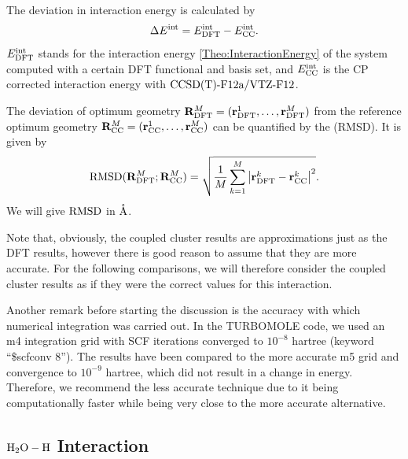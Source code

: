 The deviation in interaction energy is calculated by 
\newcommand\ecc{\enmat{\eint_{\te {CC}}}}
\begin{equation}
\Dl\eint=\eint\dft-\ecc.
\label{Bench:RefEnergy}
\end{equation}
$E^{\text{int}}_{\text{DFT}}$ stands for the interaction energy \eqref{Theo:InteractionEnergy} of
the system computed with a certain DFT functional and basis set, and $\ecc$ is
the CP corrected interaction energy with $\text{CCSD(T)-F12a}/\text{VTZ-F}12$.

The deviation of optimum geometry \mbox{$\mathbf{R}^M_{\text{DFT}}=(\mathbf{r}^1_{\text{DFT}},\ldots,\mathbf{r}^M_{\text{DFT}})$} from the reference optimum geometry 
\mbox{$\mathbf{R}^M_{\text{CC}}=(\mathbf{r}^1_{\text{CC}},\ldots,\mathbf{r}^M_{\text{CC}})$} can be quantified by the  (RMSD). It
is given by
\newcommand{\DRMSD}{\te{RMSD}}
\begin{equation}
\text{RMSD}(\mathbf{R}^M_{\text{DFT}};\mathbf{R}^M_{\text{CC}})=\sqrt{\frac 1 M \sum_{k=1}^M \left|{\mathbf{r}^k_{\text{DFT}}-\mathbf{r}^k_{\text{CC}}}\right|^2}.
\label{Bench:RMSD}
\end{equation}
We will give $\DRMSD$ in $\mathring{\text{A}}$.   

Note that, obviously, the coupled cluster results are approximations just as the DFT results, however
there is good reason to assume that they are more accurate. For the following comparisons, we will
therefore consider the coupled cluster results as if they were the correct values for this
interaction.

Another remark before starting the discussion is the accuracy with which
numerical integration was carried out. In the \mbox{TURBOMOLE} code, we used an
m4 integration grid with SCF iterations converged to $10^{-8}$ hartree (keyword
``\$scfconv 8''). The results have been compared to the more accurate m5 grid
and convergence to $10^{-9}$ hartree, which did not result in a change in
energy.
Therefore, we recommend the less accurate technique due to it being
computationally faster while being very close to the more accurate alternative.

\subsection{$\mbox{\ensuremath{\text H _2 \text O-\text H}}$ Interaction}

